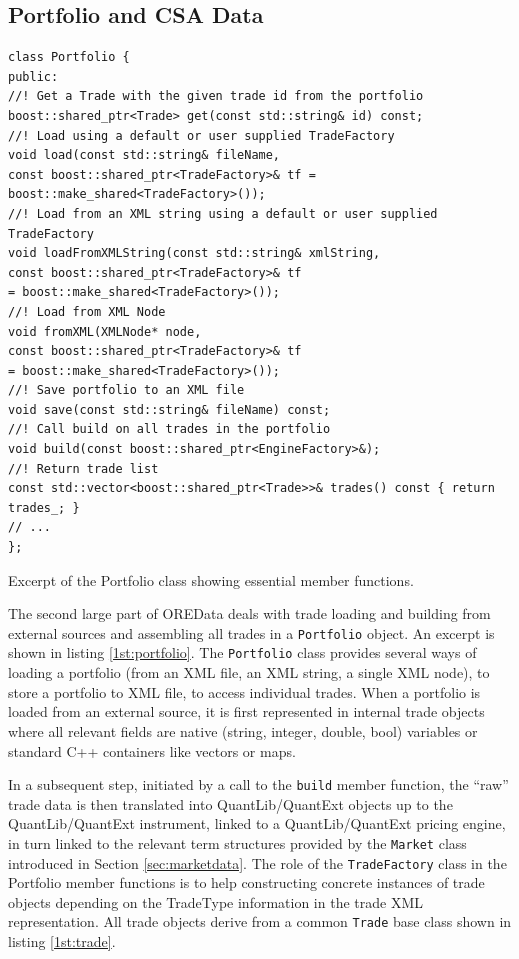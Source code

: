 \documentclass[12pt, a4paper]{article}
\begin{document}
\subsection{Portfolio and CSA Data}

\begin{listing}[H]
\begin{verbatim}
class Portfolio {
public:
//! Get a Trade with the given trade id from the portfolio
boost::shared_ptr<Trade> get(const std::string& id) const;
//! Load using a default or user supplied TradeFactory
void load(const std::string& fileName,
const boost::shared_ptr<TradeFactory>& tf = boost::make_shared<TradeFactory>());
//! Load from an XML string using a default or user supplied TradeFactory
void loadFromXMLString(const std::string& xmlString,
const boost::shared_ptr<TradeFactory>& tf
= boost::make_shared<TradeFactory>());
//! Load from XML Node
void fromXML(XMLNode* node,
const boost::shared_ptr<TradeFactory>& tf
= boost::make_shared<TradeFactory>());
//! Save portfolio to an XML file
void save(const std::string& fileName) const;
//! Call build on all trades in the portfolio
void build(const boost::shared_ptr<EngineFactory>&);
//! Return trade list
const std::vector<boost::shared_ptr<Trade>>& trades() const { return trades_; }
// ...
};
\end{verbatim}
\caption{Excerpt of the Portfolio class showing essential member functions.}
\label{1st:portfolio}
\end{listing}

The second large part of OREData deals with trade loading and building from external sources and assembling all trades in a {\tt Portfolio} object. An excerpt is shown in listing \ref{1st:portfolio}. The {\tt Portfolio} class provides several ways of loading a portfolio (from an
XML file, an XML string, a single XML node), to store a portfolio to XML file, to access individual trades. When a portfolio is loaded from an external source, it is first represented in internal trade objects where all relevant fields are native (string, integer, double, bool) variables
or standard C++ containers like vectors or maps.

In a subsequent step, initiated by a call to the {\tt build} member function, the ``raw'' trade data is then translated into QuantLib/QuantExt objects up to the QuantLib/QuantExt instrument, linked to a QuantLib/QuantExt pricing engine, in turn linked to the relevant term structures provided by the {\tt Market} class introduced in Section \ref{sec:marketdata}.
The role of the {\tt TradeFactory} class in the Portfolio member functions is to help constructing concrete instances of trade objects depending on the TradeType information in the trade XML representation.
All trade objects derive from a common {\tt Trade} base class shown in listing \ref{1st:trade}.
\end{document}
